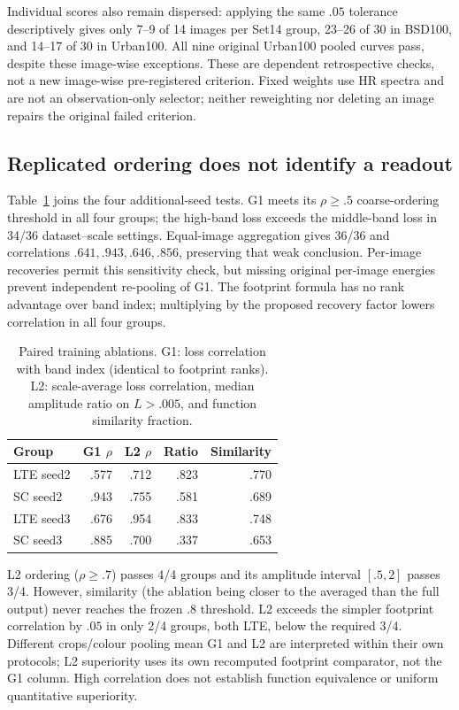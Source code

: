 Individual scores also remain dispersed: applying the same $.05$
tolerance descriptively gives only 7--9 of 14 images per Set14 group,
23--26 of 30 in BSD100, and 14--17 of 30 in Urban100. All nine original
Urban100 pooled curves pass, despite these image-wise exceptions.
These are dependent retrospective checks, not a new image-wise
pre-registered criterion. Fixed weights use HR spectra and are not an
observation-only selector; neither reweighting nor deleting an image
repairs the original failed criterion.

\subsection{Replicated ordering does not identify a readout}
Table~\ref{tab:readout} joins the four additional-seed tests. G1 meets
its $\rho\ge.5$ coarse-ordering threshold in all four groups; the high-band loss
exceeds the middle-band loss in 34/36 dataset--scale settings.
Equal-image aggregation gives 36/36 and correlations
$.641,.943,.646,.856$, preserving that weak conclusion. Per-image
recoveries permit this sensitivity check, but missing original per-image
energies prevent independent re-pooling of G1. The footprint formula
has no rank advantage over band index; multiplying by the proposed
recovery factor lowers correlation in all four groups.

\begin{table}[t]\centering
\caption{Paired training ablations. G1: loss correlation with band index
(identical to footprint ranks). L2: scale-average loss correlation,
median amplitude ratio on $L>.005$, and function similarity fraction.}
\label{tab:readout}
\begin{tabular}{lrrrr}\toprule
Group & G1 $\rho$ & L2 $\rho$ & Ratio & Similarity\\\midrule
LTE seed2 & .577 & .712 & .823 & .770\\
SC seed2 & .943 & .755 & .581 & .689\\
LTE seed3 & .676 & .954 & .833 & .748\\
SC seed3 & .885 & .700 & .337 & .653\\\bottomrule
\end{tabular}
\end{table}

L2 ordering ($\rho\ge.7$) passes 4/4 groups and its amplitude interval $[.5,2]$
passes 3/4. However, similarity (the ablation being closer to the averaged
than the full output) never reaches the frozen $.8$ threshold. L2 exceeds
the simpler footprint correlation by $.05$ in only 2/4 groups, both LTE,
below the required 3/4. Different crops/colour pooling mean G1 and L2
are interpreted within their own protocols; L2 superiority uses its
own recomputed footprint comparator, not the G1 column. High correlation does not
establish function equivalence or uniform quantitative superiority.

